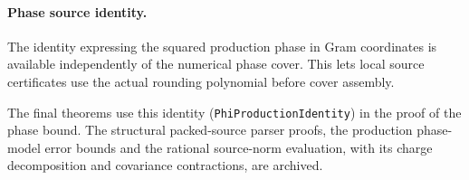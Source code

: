 \documentclass[11pt,a4paper]{article}
\newcommand{\lean}[1]{\texttt{\small #1}}
\begin{document}
\paragraph{Phase source identity.}
The identity expressing the squared production phase in Gram coordinates is
available independently of the numerical phase cover. This lets local source
certificates use the actual rounding polynomial before cover assembly.

The final theorems use this identity (\lean{PhiProductionIdentity}) in the proof of the
phase bound. The structural packed-source parser proofs, the production phase-model error
bounds and the rational source-norm evaluation, with its charge decomposition and covariance
contractions, are archived.
\end{document}
